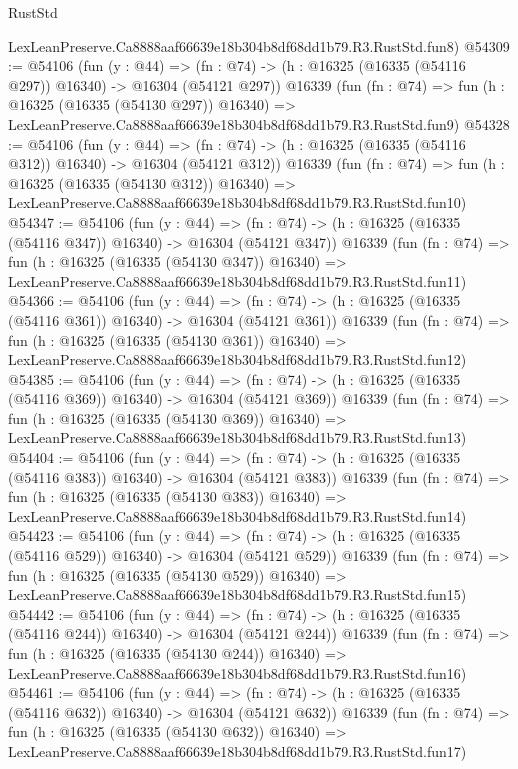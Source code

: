 \begin{lexlean}{RustStd}
\begin{coremodule}
    LexLeanPreserve.Ca8888aaf66639e18b304b8df68dd1b79.R3.RustStd.fun8)
@54309 := @54106
    (fun (y : @44) =>
    (fn : @74) -> (h : @16325 (@16335 (@54116 @297)) @16340) -> @16304 (@54121 @297))
    @16339
    (fun (fn : @74) =>
    fun (h : @16325 (@16335 (@54130 @297)) @16340) =>
    LexLeanPreserve.Ca8888aaf66639e18b304b8df68dd1b79.R3.RustStd.fun9)
@54328 := @54106
    (fun (y : @44) =>
    (fn : @74) -> (h : @16325 (@16335 (@54116 @312)) @16340) -> @16304 (@54121 @312))
    @16339
    (fun (fn : @74) =>
    fun (h : @16325 (@16335 (@54130 @312)) @16340) =>
    LexLeanPreserve.Ca8888aaf66639e18b304b8df68dd1b79.R3.RustStd.fun10)
@54347 := @54106
    (fun (y : @44) =>
    (fn : @74) -> (h : @16325 (@16335 (@54116 @347)) @16340) -> @16304 (@54121 @347))
    @16339
    (fun (fn : @74) =>
    fun (h : @16325 (@16335 (@54130 @347)) @16340) =>
    LexLeanPreserve.Ca8888aaf66639e18b304b8df68dd1b79.R3.RustStd.fun11)
@54366 := @54106
    (fun (y : @44) =>
    (fn : @74) -> (h : @16325 (@16335 (@54116 @361)) @16340) -> @16304 (@54121 @361))
    @16339
    (fun (fn : @74) =>
    fun (h : @16325 (@16335 (@54130 @361)) @16340) =>
    LexLeanPreserve.Ca8888aaf66639e18b304b8df68dd1b79.R3.RustStd.fun12)
@54385 := @54106
    (fun (y : @44) =>
    (fn : @74) -> (h : @16325 (@16335 (@54116 @369)) @16340) -> @16304 (@54121 @369))
    @16339
    (fun (fn : @74) =>
    fun (h : @16325 (@16335 (@54130 @369)) @16340) =>
    LexLeanPreserve.Ca8888aaf66639e18b304b8df68dd1b79.R3.RustStd.fun13)
@54404 := @54106
    (fun (y : @44) =>
    (fn : @74) -> (h : @16325 (@16335 (@54116 @383)) @16340) -> @16304 (@54121 @383))
    @16339
    (fun (fn : @74) =>
    fun (h : @16325 (@16335 (@54130 @383)) @16340) =>
    LexLeanPreserve.Ca8888aaf66639e18b304b8df68dd1b79.R3.RustStd.fun14)
@54423 := @54106
    (fun (y : @44) =>
    (fn : @74) -> (h : @16325 (@16335 (@54116 @529)) @16340) -> @16304 (@54121 @529))
    @16339
    (fun (fn : @74) =>
    fun (h : @16325 (@16335 (@54130 @529)) @16340) =>
    LexLeanPreserve.Ca8888aaf66639e18b304b8df68dd1b79.R3.RustStd.fun15)
@54442 := @54106
    (fun (y : @44) =>
    (fn : @74) -> (h : @16325 (@16335 (@54116 @244)) @16340) -> @16304 (@54121 @244))
    @16339
    (fun (fn : @74) =>
    fun (h : @16325 (@16335 (@54130 @244)) @16340) =>
    LexLeanPreserve.Ca8888aaf66639e18b304b8df68dd1b79.R3.RustStd.fun16)
@54461 := @54106
    (fun (y : @44) =>
    (fn : @74) -> (h : @16325 (@16335 (@54116 @632)) @16340) -> @16304 (@54121 @632))
    @16339
    (fun (fn : @74) =>
    fun (h : @16325 (@16335 (@54130 @632)) @16340) =>
    LexLeanPreserve.Ca8888aaf66639e18b304b8df68dd1b79.R3.RustStd.fun17)

\end{coremodule}
\end{lexlean}
